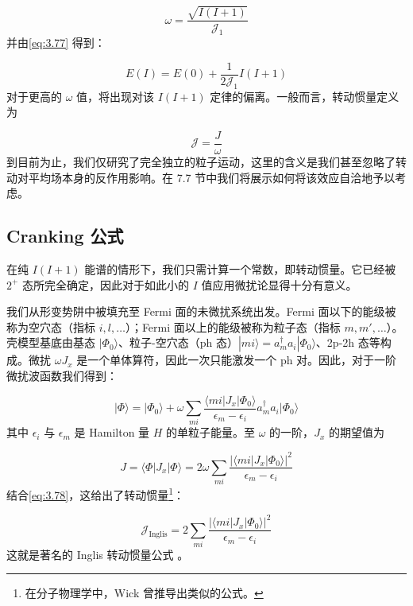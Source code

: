 \begin{equation}
\omega=\frac{\sqrt{I(I+1)}}{\mathcal{J}_{1}}\label{eq:3.84}
\end{equation}
并由\ref{eq:3.77} 得到：

\begin{equation}
E(I)=E(0)+\frac{1}{2\mathcal{J}_{1}}I(I+1)\label{eq:3.85}
\end{equation}
对于更高的 $\omega$ 值，将出现对该 $I(I+1)$ 定律的偏离。一般而言，转动惯量定义为

\begin{equation}
\mathcal{J}=\frac{J}{\omega}\label{eq:3.86}
\end{equation}
到目前为止，我们仅研究了完全独立的粒子运动，这里的含义是我们甚至忽略了转动对平均场本身的反作用影响。在 7.7 节中我们将展示如何将该效应自洽地予以考虑。

\subsection{Cranking 公式}

在纯 $I(I+1)$ 能谱的情形下，我们只需计算一个常数，即转动惯量。它已经被 $2^{+}$ 态所完全确定，因此对于如此小的
$I$ 值应用微扰论显得十分有意义。

我们从形变势阱中被填充至 Fermi 面的未微扰系统出发。Fermi 面以下的能级被称为空穴态（指标 $i,l,\dots$）；Fermi
面以上的能级被称为粒子态（指标 $m,m',\dots$）。壳模型基底由基态 $|\Phi_{0}\rangle$、粒子-空穴态（ph
态）$|mi\rangle=a^{\dagger}_{m}a_{i}|\Phi_{0}\rangle$、2p-2h 态等构成。微扰
$\omega J_{x}$ 是一个单体算符，因此一次只能激发一个 ph 对。因此，对于一阶微扰波函数我们得到：

\begin{equation}
|\Phi\rangle=|\Phi_{0}\rangle+\omega\sum_{mi}\frac{\langle mi|J_{x}|\Phi_{0}\rangle}{\epsilon_{m}-\epsilon_{i}}a^{\dagger}_{m}a_{i}|\Phi_{0}\rangle\label{eq:3.87}
\end{equation}
其中 $\epsilon_{i}$ 与 $\epsilon_{m}$ 是 Hamilton 量 $H$ 的单粒子能量。至 $\omega$
的一阶，$J_{x}$ 的期望值为

\begin{equation}
J=\langle\Phi|J_{x}|\Phi\rangle=2\omega\sum_{mi}\frac{|\langle mi|J_{x}|\Phi_{0}\rangle|^{2}}{\epsilon_{m}-\epsilon_{i}}\label{eq:3.88}
\end{equation}
结合\ref{eq:3.78}，这给出了转动惯量\footnote{在分子物理学中，Wick \cite{Wi48} 曾推导出类似的公式。}：

\begin{equation}
\mathcal{J}_{\text{Inglis}}=2\sum_{mi}\frac{|\langle mi|J_{x}|\Phi_{0}\rangle|^{2}}{\epsilon_{m}-\epsilon_{i}}\label{eq:3.89}
\end{equation}
这就是著名的 Inglis 转动惯量公式 \cite{In54,BM55}。

